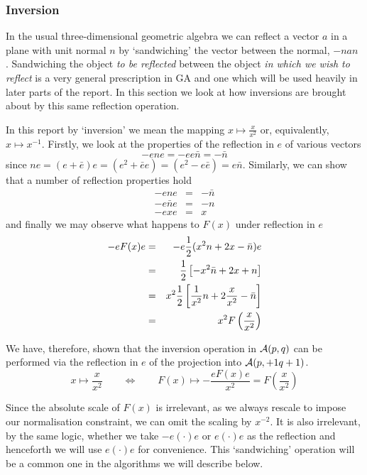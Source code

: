 \subsubsection{Inversion}


In the usual three-dimensional geometric algebra we can reflect a vector $a$ in a plane with
unit normal $n$ by `sandwiching' the vector between the normal, $-nan$
\cite{IJCV98}. Sandwiching the object \emph{to be reflected} between the object
\emph{in which we wish to reflect} is a very general prescription in GA and
one which will be used heavily in later parts of the report.  In this section
we look at how inversions are brought about by this same reflection operation.

In this report by `inversion' we mean the mapping $x \mapsto \frac{x}{x^2}$ or,
equivalently, $x \mapsto x^{-1}$. Firstly, we look at the properties of
the reflection in $e$ of various vectors
%
\[ -ene  = -ee\bar{n} = -\bar{n} \] 
since $ne = (e+\bar{e})e=(e^2+\bar{e}e)= (e^2 - e\bar{e}) = e\bar{n}$. 
Similarly, we can show that a number of reflection properties hold
%
\begin{eqnarray} -ene & = &  -\bar{n}  \\ -e\bar{n}e & = &  -{n}  \\ -exe & = &
x \end{eqnarray}
%
and finally we may observe what happens to $F(x)$ under reflection in $e$
%
\begin{eqnarray} -eF(x)e & = &  -e\frac{1}{2}(x^2n + 2x - \bar{n})e  \nonumber \\ & = &
\frac{1}{2}\left[-x^2\bar{n} + 2x + n\right] \nonumber \\ & = &  x^2\frac{1}{2}\left[
\frac{1}{x^2}n + 2\frac{x}{x^2} - \bar{n}\right] \nonumber \\ & = &  x^2
F\left(\frac{x}{x^2}\right) \end{eqnarray}
%

We have, therefore, shown that the inversion operation in ${\mathcal{A}}(p,q)$ can be
performed via the reflection in $e$ of the projection into ${\mathcal{A}}(p,+1q+1)$.
 \begin{equation} x \mapsto \frac{x}{x^2} \qquad \Leftrightarrow \qquad F(x) \mapsto
 -\frac{eF(x)e}{x^2} = F\left(\frac{x}{x^2}\right) \end{equation}
%

Since the absolute scale of $F(x)$ is irrelevant, as we always rescale to
impose our normalisation constraint, we can omit the scaling by $x^{-2}$.  It
is also irrelevant, by the same logic, whether we take $-e(\cdot)e$ or
$e(\cdot)e$ as the reflection and henceforth we will use $e(\cdot)e$ for
convenience. This `sandwiching' operation will be a common one in the algorithms
we will describe below.

